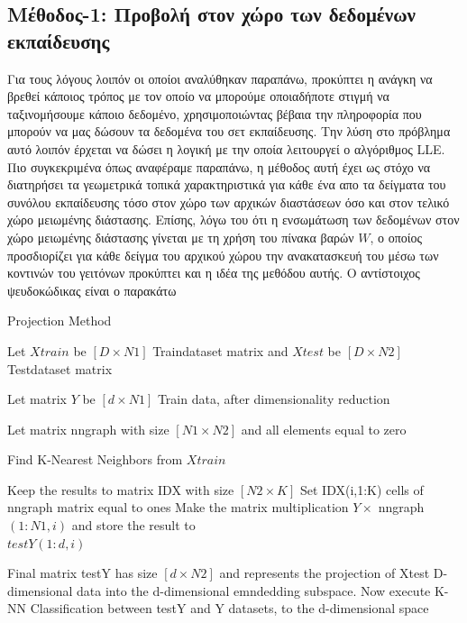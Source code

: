 \subsection{Μέθοδος-1: Προβολή στον χώρο των δεδομένων εκπαίδευσης}
\par
Για τους λόγους λοιπόν οι οποίοι αναλύθηκαν παραπάνω, προκύπτει η ανάγκη να βρεθεί κάποιος τρόπος με τον οποίο να μπορούμε οποιαδήποτε στιγμή να ταξινομήσουμε κάποιο δεδομένο, χρησιμοποιώντας βέβαια την πληροφορία που μπορούν να μας δώσουν τα δεδομένα του σετ εκπαίδευσης. Την λύση στο πρόβλημα αυτό λοιπόν έρχεται να δώσει η λογική με την οποία λειτουργεί ο αλγόριθμος \textlatin{LLE}. Πιο συγκεκριμένα όπως αναφέραμε παραπάνω, η μέθοδος αυτή έχει ως στόχο να διατηρήσει τα γεωμετρικά τοπικά χαρακτηριστικά για κάθε ένα απο τα δείγματα του συνόλου εκπαίδευσης τόσο στον χώρο των αρχικών διαστάσεων όσο και στον τελικό χώρο μειωμένης διάστασης. Επίσης, λόγω του ότι η ενσωμάτωση των δεδομένων στον χώρο μειωμένης διάστασης γίνεται με τη χρήση του πίνακα βαρών $W$, ο οποίος προσδιορίζει για κάθε δείγμα του αρχικού χώρου την ανακατασκευή του μέσω των κοντινών του γειτόνων προκύπτει και η ιδέα της μεθόδου αυτής. Ο αντίστοιχος ψευδοκώδικας είναι ο παρακάτω
\begin{algorithm}
   \caption{Projection Method}
    \begin{algorithmic}[1]   	
    	\State Let $Xtrain$ be $[D \times N1]$ Train\textunderscore dataset matrix and $Xtest$ be $[D \times N2]$ Test\textunderscore dataset matrix 
		\State 
    	
    	\State Let matrix $Y$ be $[d \times N1]$ Train data, after dimensionality reduction 
    	\State
    	
    	\State Let matrix nn\textunderscore graph with size $[N1 \times N2]$ and all elements equal to zero
    	\State 
        
            \State Find K-Nearest Neighbors from $Xtrain$
        \EndFor
        \State
		
		\State Keep the results to matrix IDX with size $[N2 \times K]$ 
            \State Set IDX(i,1:K) cells of nn\textunderscore graph matrix equal to ones
            \State Make the matrix multiplication $Y \times$ nn\textunderscore graph$(1:N1,i)$ and store the result to \\ $testY(1:d,i)$ 
        \EndFor
        \State 
        
        \State Final matrix testY has size $[d \times N2]$ and represents the projection of Xtest D-dimensional data into the d-dimensional emndedding subspace.  
        \State
        \State Now execute K-NN Classification between testY and Y datasets, to the d-dimensional space
	\end{algorithmic}
\end{algorithm}
